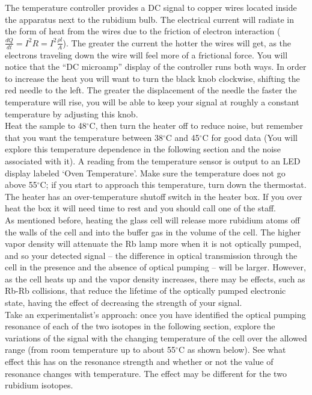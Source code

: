 \documentclass{../lab}
\begin{document}
The temperature controller provides a DC signal to copper wires located inside the apparatus next to the rubidium bulb. The electrical current will radiate in the form of heat from the wires due to the friction of electron interaction ($\frac{dQ}{dt} = I^2 R = I^2 \frac{\rho l}{A}$).  The greater the current the hotter the wires will get, as the electrons traveling down the wire will feel more of a frictional force. You will notice that the ``DC microamp'' display of the controller runs both ways. In order to increase the heat you will want to turn the black knob clockwise, shifting the red needle to the left. The greater the displacement of the needle the faster the temperature will rise, you will be able to keep your signal at roughly a constant temperature by adjusting this knob. \\

Heat the sample to 48$^\circ$C, then turn the heater off to reduce noise, but remember that you want the temperature between 38$^\circ$C and 45$^\circ$C for good data (You will explore this temperature dependence in the following section and the noise associated with it). A reading from the temperature sensor is output to an LED display labeled `Oven Temperature'. Make sure the temperature does not go above 55$^\circ$C; if you start to approach this temperature, turn down the thermostat. The heater has an over-temperature shutoff switch in the heater box. If you over heat the box it will need time to rest and you should call one of the staff. \\

As mentioned before, heating the glass cell will release more rubidium atoms off the walls of the cell and into the buffer gas in the volume of the cell. The higher vapor density will attenuate the Rb lamp more when it is not optically pumped, and so your detected signal -- the difference in optical transmission through the cell in the presence and the absence of optical pumping -- will be larger. However, as the cell heats up and the vapor density increases, there may be effects, such as Rb-Rb collisions, that reduce the lifetime of the optically pumped electronic state, having the effect of decreasing the strength of your signal. \\

Take an experimentalist's approach: once you have identified the optical pumping resonance of each of the two isotopes in the following section, explore the variations of the signal with the changing temperature of the cell over the allowed range (from room temperature up to about 55$^\circ$C as shown below). See what effect this has on the resonance strength and whether or not the value of resonance changes with temperature. The effect may be different for the two rubidium isotopes.
\end{document}
